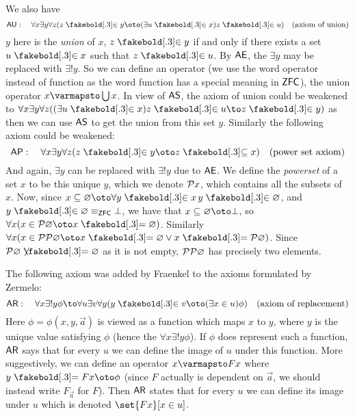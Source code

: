 We also have
$$ {\sf AU}:\quad \forall x\exists y\forall z(z\inb y\oto(\exists u\inb x)z\inb u)\quad (\hbox{axiom of union}) $$
$y$ here is the {\it union} of $x$, $z\inb y$ if and only if there exists a set $u\inb x$ such that $z\inb u$.
By ${\sf AE}$, the $\exists y$ may be replaced with $\exists!y$.
So we can define an operator (we use the word operator instead of function as the word function has a special meaning in ${\sf ZFC}$), the union operator $x\varmapsto\bigcup x$.
In view of ${\sf AS}$, the axiom of union could be weakened to $\forall x\exists y\forall z((\exists u\inb x)z\inb u\to z\inb y)$ as then we can use ${\sf AS}$ to get the union from this set $y$.
Similarly the following axiom could be weakened:
$$ {\sf AP}:\quad \forall x\exists y\forall z(z\inb y\oto z\subseteqb x)\quad (\hbox{power set axiom}) $$
And again, $\exists y$ can be replaced with $\exists!y$ due to ${\sf AE}$.
We define the {\it powerset} of a set $x$ to be this unique $y$, which we denote ${\cal P}x$, which contains all the subsets of $x$.
Now, since $x\subseteq\varnothing\oto\forall y\inb x\,y\inb\varnothing$, and $y\inb\varnothing\equiv_{\sf ZFC}\bot$, we have that $x\subseteq\varnothing\oto\bot$, so
$\forall x(x\in{\cal P}\varnothing\oto x\eq\varnothing)$.
Similarly $\forall x(x\in{\cal PP}\varnothing\oto x\eq\varnothing\lor x\eq{\cal P}\varnothing)$.
Since ${\cal P}\varnothing\neqb\varnothing$ as it is not empty, ${\cal PP}\varnothing$ has precisely two elements.

The following axiom was added by Fraenkel to the axioms formulated by Zermelo:
$$ {\sf AR}:\quad \forall x\exists!y\phi\to\forall u\exists v\forall y(y\inb v\oto(\exists x\in u)\phi)\quad (\hbox{axiom of replacement}) $$
Here $\phi=\phi(x,y,\vec a)$ is viewed as a function which maps $x$ to $y$, where $y$ is the unique value satisfying $\phi$ (hence the $\forall x\exists!y\phi$).
If $\phi$ does represent such a function, ${\sf AR}$ says that for every $u$ we can define the image of $u$ under this function.
More suggestively, we can define an operator $x\varmapsto Fx$ where $y\eq Fx\oto\phi$ (since $F$ actually is dependent on $\vec a$, we should instead write $F_{\vec a}$ for $F$).
Then ${\sf AR}$ states that for every $u$ we can define its image under $u$ which is denoted $\set{Fx}[x\in u]$.

